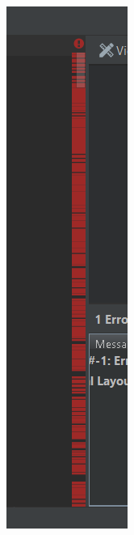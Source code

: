 \documentclass{beamer}
\begin{document}
\begin{frame}
\begin{figure}
\begin{minipage}[H]{0.50\linewidth}
        \includegraphics[scale=0.30]{echecbug.png}
    \end{minipage}\hfill
  \end{figure}
\end{frame}
\end{document}
